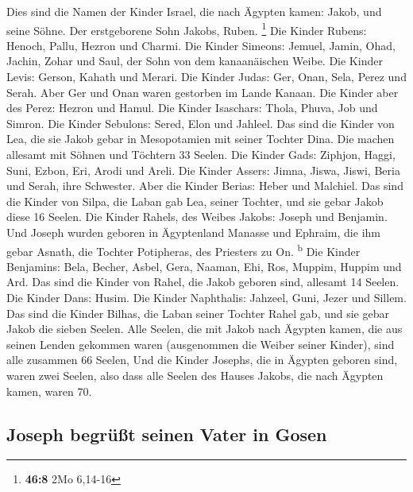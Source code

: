  Dies sind die Namen der Kinder Israel, die nach Ägypten
kamen: Jakob, und seine Söhne. Der erstgeborene Sohn Jakobs, Ruben.
\footnote{\textbf{46:8} 2Mo 6,14-16}  Die Kinder Rubens:
Henoch, Pallu, Hezron und Charmi.  Die Kinder Simeons:
Jemuel, Jamin, Ohad, Jachin, Zohar und Saul, der Sohn von dem
kanaanäischen Weibe.  Die Kinder Levis: Gerson, Kahath
und Merari.  Die Kinder Judas: Ger, Onan, Sela, Perez und
Serah. Aber Ger und Onan waren gestorben im Lande Kanaan. Die Kinder
aber des Perez: Hezron und Hamul.  Die Kinder Isaschars:
Thola, Phuva, Job und Simron.  Die Kinder Sebulons:
Sered, Elon und Jahleel.  Das sind die Kinder von Lea,
die sie Jakob gebar in Mesopotamien mit seiner Tochter Dina. Die machen
allesamt mit Söhnen und Töchtern 33 Seelen.  Die Kinder
Gads: Ziphjon, Haggi, Suni, Ezbon, Eri, Arodi und Areli. 
Die Kinder Assers: Jimna, Jiswa, Jiswi, Beria und Serah, ihre Schwester.
Aber die Kinder Berias: Heber und Malchiel.  Das sind die
Kinder von Silpa, die Laban gab Lea, seiner Tochter, und sie gebar Jakob
diese 16 Seelen.  Die Kinder Rahels, des Weibes Jakobs:
Joseph und Benjamin.  Und Joseph wurden geboren in
Ägyptenland Manasse und Ephraim, die ihm gebar Asnath, die Tochter
Potipheras, des Priesters zu On. \textsuperscript{b}  Die
Kinder Benjamins: Bela, Becher, Asbel, Gera, Naaman, Ehi, Ros, Muppim,
Huppim und Ard.  Das sind die Kinder von Rahel, die Jakob
geboren sind, allesamt 14 Seelen.  Die Kinder Dans:
Husim.  Die Kinder Naphthalis: Jahzeel, Guni, Jezer und
Sillem.  Das sind die Kinder Bilhas, die Laban seiner
Tochter Rahel gab, und sie gebar Jakob die sieben Seelen.
 Alle Seelen, die mit Jakob nach Ägypten kamen, die aus
seinen Lenden gekommen waren (ausgenommen die Weiber seiner Kinder),
sind alle zusammen 66 Seelen,  Und die Kinder Josephs,
die in Ägypten geboren sind, waren zwei Seelen, also dass alle Seelen
des Hauses Jakobs, die nach Ägypten kamen, waren 70.

\hypertarget{joseph-begruxfcuxdft-seinen-vater-in-gosen}{%
\subsection{Joseph begrüßt seinen Vater in
Gosen}\label{joseph-begruxfcuxdft-seinen-vater-in-gosen}}

